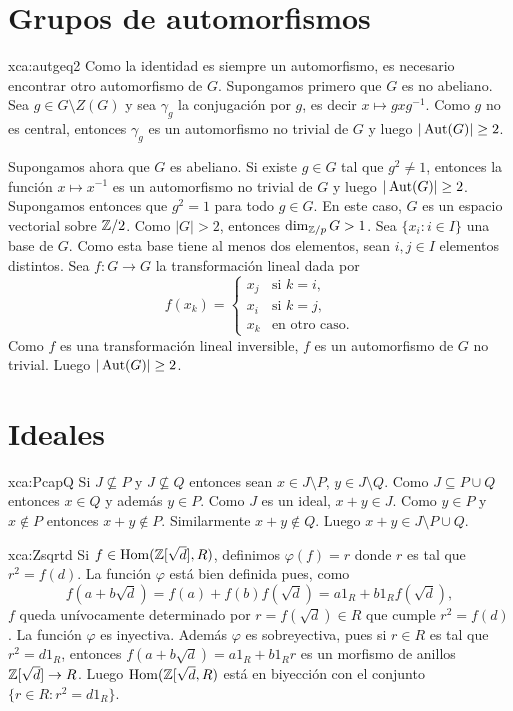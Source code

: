 \section*{Grupos de automorfismos}

\begin{sol}{xca:autgeq2}
Como la identidad es siempre un automorfismo, es necesario encontrar otro automorfismo de $G$. 
Supongamos primero que $G$ es no abeliano. Sea $g\in G\setminus Z(G)$ y sea $\gamma_g$ la conjugación
por $g$, es decir $x\mapsto gxg^{-1}$. Como $g$ no es central, entonces 
$\gamma_g$ es un automorfismo no trivial de $G$ y luego $|\operatorname{Aut}(G)|\geq2$. 

Supongamos ahora que $G$ es abeliano. Si existe $g\in G$ tal que $g^2\ne 1$, entonces
la función $x\mapsto x^{-1}$ es un automorfismo no trivial de $G$ y luego 
$|\operatorname{Aut}(G)|\geq2$. Supongamos entonces que $g^2=1$ para todo $g\in G$. En este caso, 
$G$ es un espacio vectorial sobre $\mathbb{Z}/2$. Como $|G|>2$, entonces
$\dim_{\mathbb{Z}/p} G>1$. Sea $\{x_i:i\in I\}$ una base de $G$. Como esta base tiene al menos dos elementos,
sean $i,j\in I$ elementos distintos. Sea $f\colon G\to G$ la transformación lineal dada por 
\[
f(x_k)=\begin{cases}
x_j & \text{si $k=i$},\\
x_i & \text{si $k=j$},\\
x_k & \text{en otro caso}.	
\end{cases}
\]
Como $f$ es una transformación lineal inversible,  
$f$ es un automorfismo de $G$ no trivial. Luego $|\operatorname{Aut}(G)|\geq2$.   
\end{sol}

\section*{Ideales}

\begin{sol}{xca:PcapQ} 
	Si $J\not\subseteq P$ y $J\not\subseteq Q$ entonces sean
	$x\in J\setminus P$, $y\in J\setminus Q$. Como $J\subseteq P\cup Q$
	entonces $x\in Q$ y además $y\in P$. Como $J$ es un ideal, $x+y\in J$. Como
	$y\in P$ y $x\not\in P$ entonces $x+y\not\in P$. Similarmente $x+y\not\in
	Q$.  Luego $x+y\in J\setminus P\cup Q$.
\end{sol}

\begin{sol}{xca:Zsqrtd}
Si $f\in\operatorname{Hom}(\mathbb{Z}[\sqrt{d}],R)$, definimos $\varphi(f)=r$ donde $r$ es tal que 
$r^2=f(d)$. La función $\varphi$ está bien definida pues, como 
\[
f(a+b\sqrt{d})=f(a)+f(b)f(\sqrt{d})=a1_R+b1_Rf(\sqrt{d}),
\]
$f$ queda unívocamente determinado por $r=f(\sqrt{d})\in R$
que cumple $r^2=f(d)$. La función $\varphi$ es inyectiva. Además $\varphi$ es sobreyectiva, pues
si $r\in R$ es tal que $r^2=d1_R$, entonces 
$f(a+b\sqrt{d})=a1_R+b1_Rr$ es un morfismo de anillos $\mathbb{Z}[\sqrt{d}]\to R$. 
Luego $\operatorname{Hom}(\mathbb{Z}[\sqrt{d},R)$ está en biyección con 
el conjunto $\{r\in R:r^2=d1_R\}$. 
\end{sol}

